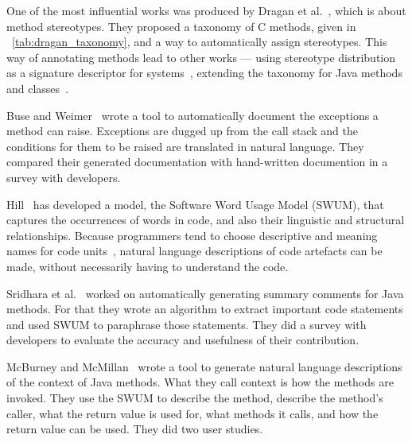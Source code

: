 \documentclass[a4paper,11pt]{sdm_internship}
\newcommand\CC{C\nolinebreak[4]\hspace{-.05em}\raisebox{.4ex}{\relsize{-3}{\textbf{++}}}}
\theoremstyle{definition}
\begin{document}
One of the most influential works was produced by Dragan et al.~\cite{dragan2006reverse,dragan2011emergent}, which is about method stereotypes.
They proposed a taxonomy of \CC{} methods, given in \tablename~\ref{tab:dragan_taxonomy}, and a way to automatically assign stereotypes.
This way of annotating methods lead to other works --- using stereotype distribution as a signature descriptor for systems~\cite{dragan2009using}, extending the taxonomy for Java methods and classes~\cite{moreno2012jstereocode}.

Buse and Weimer~\cite{buse2008automatic} wrote a tool to automatically document the exceptions a method can raise.
Exceptions are dugged up from the call stack and the conditions for them to be raised are translated in natural language.
They compared their generated documentation with hand-written documention in a survey with developers.

Hill~\cite{hill2009automatically,hill2010integrating} has developed a model, the Software Word Usage Model (SWUM), that captures the occurrences of words in code, and also their linguistic and structural relationships.
Because programmers tend to choose descriptive and meaning names for code units~\cite{liblit2006cognitive}, natural language descriptions of code artefacts can be made, without necessarily having to understand the code.

Sridhara et al.~\cite{sridhara2010towards,sridhara2012automatic} worked on automatically generating summary comments for Java methods.
For that they wrote an algorithm to extract important code statements and used SWUM to paraphrase those statements.
They did a survey with developers to evaluate the accuracy and usefulness of their contribution.

McBurney and McMillan~\cite{mcburney2016automatic} wrote a tool to generate natural language descriptions of the context of Java methods.
What they call context is how the methods are invoked.
They use the SWUM to describe the method, describe the method's caller, what the return value is used for, what methods it calls, and how the return value can be used.
They did two user studies.
\end{document}
